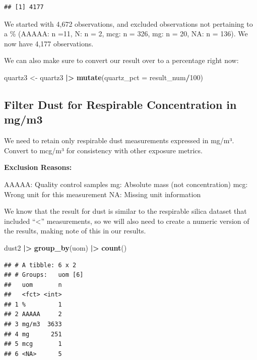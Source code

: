 \documentclass[
]{article}
\newenvironment{Shaded}{\begin{snugshade}}{\end{snugshade}}
\newcommand{\AttributeTok}[1]{\textcolor[rgb]{0.13,0.29,0.53}{#1}}
\newcommand{\DecValTok}[1]{\textcolor[rgb]{0.00,0.00,0.81}{#1}}
\newcommand{\FunctionTok}[1]{\textcolor[rgb]{0.13,0.29,0.53}{\textbf{#1}}}
\newcommand{\NormalTok}[1]{#1}
\newcommand{\OtherTok}[1]{\textcolor[rgb]{0.56,0.35,0.01}{#1}}
\newcommand{\SpecialCharTok}[1]{\textcolor[rgb]{0.81,0.36,0.00}{\textbf{#1}}}
\begin{document}
\begin{verbatim}
## [1] 4177
\end{verbatim}

We started with 4,672 observations, and excluded observations not
pertaining to a \% (AAAAA: n =11, N: n = 2, mcg: n = 326, mg: n = 20,
NA: n = 136). We now have 4,177 observations.

We can also make sure to convert our result over to a percentage right
now:

\begin{Shaded}
\begin{Highlighting}[]
\NormalTok{quartz3 }\OtherTok{\textless{}{-}}\NormalTok{ quartz3 }\SpecialCharTok{|\textgreater{}} 
  \FunctionTok{mutate}\NormalTok{(}\AttributeTok{quartz\_pct =}\NormalTok{ result\_num}\SpecialCharTok{/}\DecValTok{100}\NormalTok{)}
\end{Highlighting}
\end{Shaded}

\subsection{Filter Dust for Respirable Concentration in
mg/m3}\label{filter-dust-for-respirable-concentration-in-mgm3}

We need to retain only respirable dust measurements expressed in mg/m³.
Convert to mcg/m³ for consistency with other exposure metrics.

\textbf{Exclusion Reasons:}

AAAAA: Quality control samples mg: Absolute mass (not concentration)
mcg: Wrong unit for this measurement NA: Missing unit information

We know that the result for dust is similar to the respirable silica
dataset that included ``\textless{}'' measurements, so we will also need
to create a numeric version of the results, making note of this in our
results.

\begin{Shaded}
\begin{Highlighting}[]
\NormalTok{dust2 }\SpecialCharTok{|\textgreater{}} 
  \FunctionTok{group\_by}\NormalTok{(uom) }\SpecialCharTok{|\textgreater{}} 
  \FunctionTok{count}\NormalTok{()}
\end{Highlighting}
\end{Shaded}

\begin{verbatim}
## # A tibble: 6 x 2
## # Groups:   uom [6]
##   uom       n
##   <fct> <int>
## 1 %         1
## 2 AAAAA     2
## 3 mg/m3  3633
## 4 mg      251
## 5 mcg       1
## 6 <NA>      5
\end{verbatim}
\end{document}
